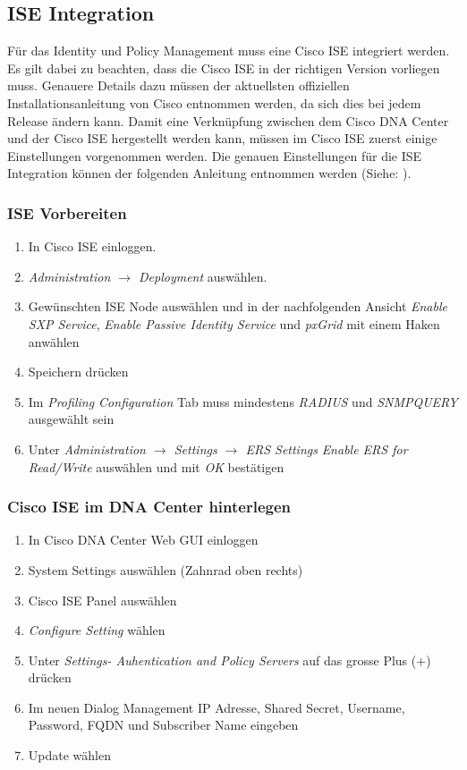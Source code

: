 \subsection{ISE Integration}
Für das Identity und Policy Management muss eine Cisco ISE integriert werden. Es gilt dabei zu beachten, dass die Cisco ISE in der richtigen Version vorliegen muss. Genauere Details dazu müssen der aktuellsten offiziellen Installationsanleitung von Cisco entnommen werden, da sich dies bei jedem Release ändern kann.
Damit eine Verknüpfung zwischen dem Cisco DNA Center und der Cisco ISE hergestellt werden kann, müssen im Cisco ISE zuerst einige Einstellungen vorgenommen werden. 
Die genauen Einstellungen für die ISE Integration können der folgenden Anleitung entnommen werden (Siehe: \cite{cisco-dna-appliance-installation-guide-release-1-chapter-post-installation-task}).

\subsubsection{ISE Vorbereiten}

\begin{enumerate}
	\item In Cisco ISE einloggen.
	\item \textit{Administration $\rightarrow$ Deployment} auswählen.
	\item Gewünschten ISE Node auswählen und in der nachfolgenden Ansicht \textit{Enable SXP Service}, \textit{Enable Passive Identity Service} und \textit{pxGrid} mit einem Haken anwählen
	\item Speichern drücken
	\item Im \textit{Profiling Configuration} Tab muss mindestens \textit{RADIUS} und \textit{SNMPQUERY} ausgewählt sein
	\item Unter \textit{Administration $\rightarrow$ Settings $\rightarrow$ ERS Settings} \textit{Enable ERS for Read/Write} auswählen und mit \textit{OK} bestätigen
\end{enumerate}

\subsubsection{Cisco ISE im DNA Center hinterlegen}
\begin{enumerate}
	\item In Cisco DNA Center Web GUI einloggen
	\item System Settings auswählen (Zahnrad oben rechts)
	\item Cisco ISE Panel auswählen
	\item \textit{Configure Setting} wählen
	\item Unter \textit{Settings- Auhentication and Policy Servers} auf das grosse Plus (+) drücken
	\item Im neuen Dialog Management IP Adresse, Shared Secret, Username, Password, FQDN und  Subscriber Name eingeben
	\item Update wählen
\end{enumerate}

